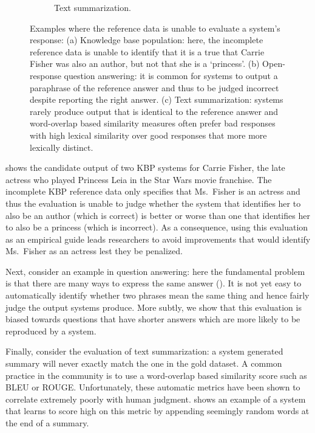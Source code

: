 \begin{figure}
\begin{subfigure}{0.65\textwidth}
    \caption{\label{fig:intro:example-summarization} Text summarization. }
  \end{subfigure}
  \caption{\label{fig:intro:examples} Examples where the reference   data is unable to evaluate a system's response:
  (a) Knowledge base population: here, the incomplete reference data is unable to identify that it is a true that Carrie Fisher was also an author, but not that she is a `princess'.
  (b) Open-response question answering: it is common for systems to output a paraphrase of the reference answer and thus to be judged incorrect despite reporting the right answer.
  (c) Text summarization: systems rarely produce output that is identical to the reference answer and word-overlap based similarity measures often prefer bad responses with high lexical similarity over good responses that more more lexically distinct.  
  }
\end{figure}

 shows the candidate output of two KBP systems for Carrie Fisher, the late actress who played Princess Leia in the Star Wars movie franchise.
The incomplete KBP reference data only specifies that Ms.\ Fisher is an actress and thus the evaluation is unable to judge whether the system that identifies her to also be an author (which is correct) is better or worse than one that identifies her to also be a princess (which is incorrect).
As a consequence, using this evaluation as an empirical guide leads researchers to avoid improvements that would identify Ms.\ Fisher as an actress lest they be penalized.

Next, consider an example in question answering:
  here the fundamental problem is that there are many ways to express the same answer ().
It is not yet easy to automatically identify whether two phrases mean the same thing and hence fairly judge the output systems produce.
More subtly, we show that this evaluation is biased towards questions that have shorter answers which are more likely to be reproduced by a system.

Finally, consider the evaluation of text summarization: a system generated summary will never exactly match the one in the gold dataset.
A common practice in the community is to use a word-overlap based similarity score such as BLEU or ROUGE\@.
Unfortunately, these automatic metrics have been shown to correlate extremely poorly with human judgment.
 shows an example of a system that learns to score high on this metric by appending seemingly random words at the end of a summary.

